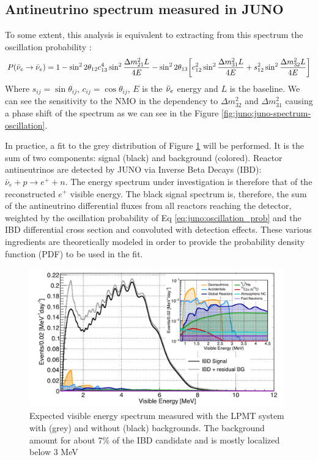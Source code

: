 \documentclass[../main.tex]{subfiles}
\begin{document}
\subsection{Antineutrino spectrum measured in JUNO}
\label{sec:juno:nom_precise_measurement}
To some extent, this analysis is equivalent to extracting from this spectrum the oscillation probability \cite{an_neutrino_2016} :
\begin{equation*}
  \label{eq:juno:oscillation_prob}
  P(\bar{\nu}_{e} \rightarrow \bar{\nu}_{e}) = 1 - \sin^2 2\theta_{12} c^4_{13} \sin^2 \frac{\Delta m^2_{21}L}{4E} - \sin^2 2\theta_{13} \bigg[ c_{12}^2 \sin^2 \frac{\Delta m_{31}^2 L}{4E} + s^2_{12} \sin^2 \frac{\Delta m_{32}^2 L}{4E} \bigg]
\end{equation*}
Where $s_{ij} = \sin \theta_{ij}$, $c_{ij} = \cos \theta_{ij}$, $E$ is the $\bar{\nu}_{e}$ energy and $L$ is the baseline.
We can see the sensitivity to the NMO in the dependency to $\Delta m_{32}^2$ and $\Delta m^2_{31}$ causing a phase shift of the spectrum as we can see in the Figure \ref{fig:juno:juno-spectrum-oscillation}.

In practice, a fit to the grey distribution of Figure \ref{fig:juno:spectrum_with_background} will be performed. It is the sum of two components: signal (black) and background (colored). Reactor antineutrinos are detected by JUNO via Inverse Beta Decays (IBD): $\bar{\nu}_e + p \rightarrow e^{+} + n$.
The energy spectrum under investigation is therefore that of the reconstructed $e^+$ visible energy. The black signal spectrum is, therefore, the sum of the antineutrino differential fluxes from all reactors reaching the detector, weighted by the oscillation probability of Eq \ref{eq:juno:oscillation_prob} and the IBD differential cross section and convoluted with detection effects.
These various ingredients are theoretically modeled in order to provide the probability density function (PDF) to be used in the fit.

\begin{figure}[ht]
  \centering
  \includegraphics[height=6cm]{images/juno/spectrum_with_background.png}
  \caption{Expected visible energy spectrum measured with the LPMT system with (grey) and without (black) backgrounds. The background amount for about 7\% of the IBD candidate and is mostly localized below 3 MeV \cite{juno_collaboration_sub-percent_2022}}
  \label{fig:juno:spectrum_with_background}
\end{figure}
\end{document}
